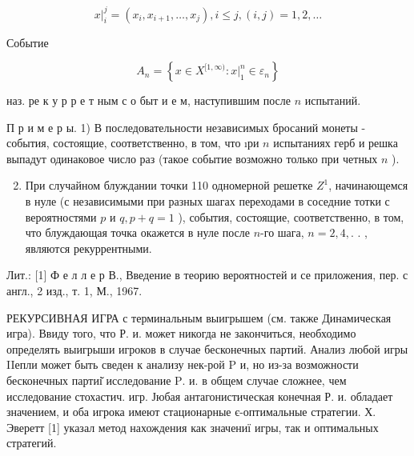\documentclass[10pt]{article}
\begin{document}
\[

\left.x\right|_{i} ^{j}=\left(x_{i}, x_{i+1}, \ldots, x_{j}\right), i \leqslant j,(i, j)=1,2, \ldots

\]



Событие



\[

A_{n}=\left\{x \in X^{[1, \infty)}:\left.x\right|_{1} ^{n} \in \varepsilon_{n}\right\}

\]



наз. ре к у р р е т ным с о быт и е м, наступившим после $n$ испытаний.



П р и м е р ы. 1) В последовательности независимых бросаний монеты - события, состоящие, соответственно, в том, что ıри $n$ испытаниях герб и решка выпадут одинаковое число раз (такое событие возможно только при четных $n$ ).



\begin{enumerate}

  \setcounter{enumi}{1}

  \item При случайном блуждании точки 110 одномерной решетке $Z^{1}$, начинающемся в нуле (с независимыми при разных шагах переходами в соседние тотки с вероятностями $p$ и $q, p+q=1$ ), события, состоящие, соответственно, в том, что блуждающая точка окажется в нуле после $n$-го шага, $n=2,4,$. . , являются рекуррентными.

\end{enumerate}



Лит.: [1] Ф е л л е р В., Введение в теорию вероятностей и се приложения, пер. с англ., 2 изд., т. 1, М., 1967.



РЕКУРСИВНАЯ ИГРА с терминальным выигрышем (см. также Динамическая игра). Ввиду того, что Р. и. может никогда не закончиться, необходимо определять выигрыши игроков в случае бесконечных партий. Анализ любой игры IIепли может быть сведен к анализу нек-рой $\mathrm{P}$ и, но из-за возможности бесконечных партиі̆ исследование $\mathrm{P}$. и. в общем случае сложнее, чем исследование стохастич. игр. Јюбая антагонистическая конечная Р. и. обладает значением, и оба игрока имеют стационарные є-оптимальные стратегии. Х. Эверетт [1] указал метод нахождения как значениї игры, так и оптимальных стратегий.
\end{document}
